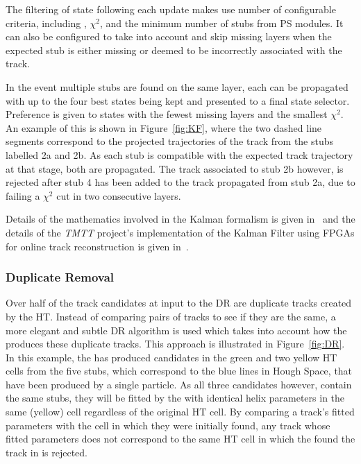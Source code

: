 The filtering of state following each update makes use number of configurable criteria, including \pT, $\chi^2$, and the minimum number of stubs from PS modules.
It can also be configured to take into account and skip missing layers when the expected stub is either missing or deemed to be incorrectly associated with the track.

In the event multiple stubs are found on the same layer, each can be propagated with up to the four best states being kept and presented to a final state selector.
Preference is given to states with the fewest missing layers and the smallest $\chi^2$.
An example of this is shown in Figure~\ref{fig:KF}, where the two dashed line segments correspond to the projected trajectories of the track from the stubs labelled 2a and 2b.
As each stub is compatible with the expected track trajectory at that stage, both are propagated.
The track associated to stub 2b however, is rejected after stub 4 has been added to the track propagated from stub 2a, due to failing a $\chi^2$ cut in two consecutive layers.

%
Details of the mathematics involved in the Kalman formalism is given in~\cite{Fruhwirth:1987fm} and the details of the \emph{TMTT} project's implementation of the Kalman Filter using FPGAs for online track reconstruction is given in~\cite{TMTT_JINST,SSummers}.

\subsubsection{Duplicate Removal}
Over half of the track candidates at input to the DR are duplicate tracks created by the HT.
Instead of comparing pairs of tracks to see if they are the same, a more elegant and subtle DR algorithm is used which takes into account how the \HT produces these duplicate tracks.
This approach is illustrated in Figure~\ref{fig:DR}.
In this example, the \HT has produced candidates in the green and two yellow HT cells from the five stubs, which correspond to the blue lines in Hough Space, that have been produced by a single particle.
As all three candidates however, contain the same stubs, they will be fitted by the \KF with identical helix parameters in the same (yellow) cell regardless of the original HT cell.
By comparing a track's fitted parameters with the \HT cell in which they were initially found, any track whose fitted parameters does not correspond to the same HT cell in which the \HT found the track in is rejected.

